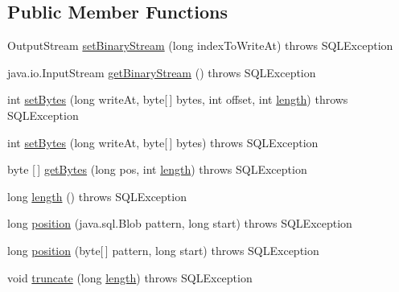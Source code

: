 \subsection*{Public Member Functions}
\begin{DoxyCompactItemize}
\item 
Output\+Stream \mbox{\hyperlink{classcom_1_1mysql_1_1jdbc_1_1_blob_from_locator_abf802cf4f616472a72e73540b2a06265}{set\+Binary\+Stream}} (long index\+To\+Write\+At)  throws S\+Q\+L\+Exception 
\item 
java.\+io.\+Input\+Stream \mbox{\hyperlink{classcom_1_1mysql_1_1jdbc_1_1_blob_from_locator_a44883808ac8f47fae08435ac5ddcc6b6}{get\+Binary\+Stream}} ()  throws S\+Q\+L\+Exception 
\item 
int \mbox{\hyperlink{classcom_1_1mysql_1_1jdbc_1_1_blob_from_locator_a6aa26db10f30f59b833a900b62e0e1a1}{set\+Bytes}} (long write\+At, byte\mbox{[}$\,$\mbox{]} bytes, int offset, int \mbox{\hyperlink{classcom_1_1mysql_1_1jdbc_1_1_blob_from_locator_a9fc208b550f8dfde5f07b1762e5db586}{length}})  throws S\+Q\+L\+Exception 
\item 
int \mbox{\hyperlink{classcom_1_1mysql_1_1jdbc_1_1_blob_from_locator_a564129d2e7b411e349ec285989c47465}{set\+Bytes}} (long write\+At, byte\mbox{[}$\,$\mbox{]} bytes)  throws S\+Q\+L\+Exception 
\item 
byte \mbox{[}$\,$\mbox{]} \mbox{\hyperlink{classcom_1_1mysql_1_1jdbc_1_1_blob_from_locator_ab3fbef493872180d7665934bfd5eeaa0}{get\+Bytes}} (long pos, int \mbox{\hyperlink{classcom_1_1mysql_1_1jdbc_1_1_blob_from_locator_a9fc208b550f8dfde5f07b1762e5db586}{length}})  throws S\+Q\+L\+Exception 
\item 
long \mbox{\hyperlink{classcom_1_1mysql_1_1jdbc_1_1_blob_from_locator_a9fc208b550f8dfde5f07b1762e5db586}{length}} ()  throws S\+Q\+L\+Exception 
\item 
long \mbox{\hyperlink{classcom_1_1mysql_1_1jdbc_1_1_blob_from_locator_ae47c22c2882286bf6b4e2870ec0c8e1f}{position}} (java.\+sql.\+Blob pattern, long start)  throws S\+Q\+L\+Exception 
\item 
long \mbox{\hyperlink{classcom_1_1mysql_1_1jdbc_1_1_blob_from_locator_a7182686d365a7bbf4ced728928ccf3b2}{position}} (byte\mbox{[}$\,$\mbox{]} pattern, long start)  throws S\+Q\+L\+Exception 
\item 
void \mbox{\hyperlink{classcom_1_1mysql_1_1jdbc_1_1_blob_from_locator_a0197778a0d86c6856a53e6d177c569b9}{truncate}} (long \mbox{\hyperlink{classcom_1_1mysql_1_1jdbc_1_1_blob_from_locator_a9fc208b550f8dfde5f07b1762e5db586}{length}})  throws S\+Q\+L\+Exception 

\end{DoxyCompactItemize}
